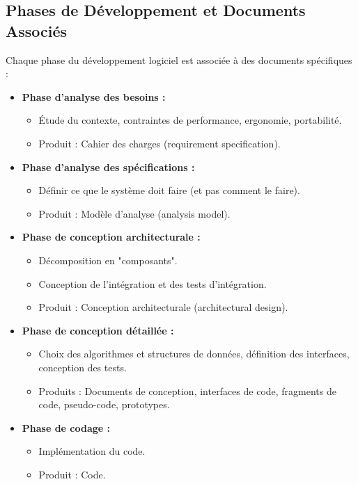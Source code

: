 \documentclass{article}
\begin{document}
\begin{itemize}
\subsection{Phases de Développement et Documents Associés}

Chaque phase du développement logiciel est associée à des documents spécifiques :

\begin{itemize}
    \item \textbf{Phase d'analyse des besoins :}
    \begin{itemize}
        \item Étude du contexte, contraintes de performance, ergonomie, portabilité.
        \item Produit : Cahier des charges (requirement specification).
    \end{itemize}
    \item \textbf{Phase d'analyse des spécifications :}
    \begin{itemize}
        \item Définir ce que le système doit faire (et pas comment le faire).
        \item Produit : Modèle d'analyse (analysis model).
    \end{itemize}
    \item \textbf{Phase de conception architecturale :}
    \begin{itemize}
        \item Décomposition en "composants".
        \item Conception de l'intégration et des tests d'intégration.
        \item Produit : Conception architecturale (architectural design).
    \end{itemize}
    \item \textbf{Phase de conception détaillée :}
    \begin{itemize}
        \item Choix des algorithmes et structures de données, définition des interfaces, conception des tests.
        \item Produits : Documents de conception, interfaces de code, fragments de code, pseudo-code, prototypes.
    \end{itemize}
    \item \textbf{Phase de codage :}
    \begin{itemize}
        \item Implémentation du code.
        \item Produit : Code.

\end{itemize}
\end{itemize}
\end{itemize}
\end{document}
